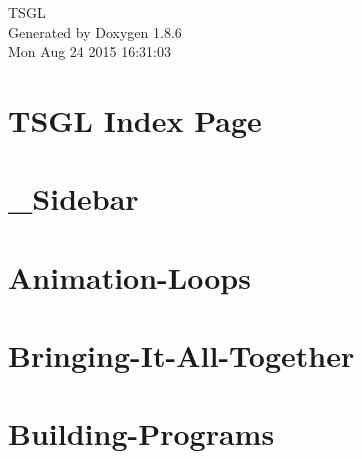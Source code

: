 \documentclass[twoside]{book}
\newcommand{\clearemptydoublepage}{%
  \newpage{\pagestyle{empty}\cleardoublepage}%
}
\begin{document}
\hypersetup{pageanchor=false}
\begin{titlepage}
\vspace*{7cm}
\begin{center}%
{\Large T\-S\-G\-L }\\
\vspace*{1cm}
{\large Generated by Doxygen 1.8.6}\\
\vspace*{0.5cm}
{\small Mon Aug 24 2015 16:31:03}\\
\end{center}
\end{titlepage}
\clearemptydoublepage
\tableofcontents
\clearemptydoublepage
{}
\hypersetup{pageanchor=true}

\chapter{T\-S\-G\-L Index Page}
\label{index}\hypertarget{index}{}
\chapter{\-\_\-\-Sidebar}
\label{md__home_kodemonkey__desktop__t_s_g_l_docs-wiki___sidebar}
\hypertarget{md__home_kodemonkey__desktop__t_s_g_l_docs-wiki___sidebar}{}

\chapter{Animation-\/\-Loops}
\label{md__home_kodemonkey__desktop__t_s_g_l_docs-wiki__animation-_loops}
\hypertarget{md__home_kodemonkey__desktop__t_s_g_l_docs-wiki__animation-_loops}{}

\chapter{Bringing-\/\-It-\/\-All-\/\-Together}
\label{md__home_kodemonkey__desktop__t_s_g_l_docs-wiki__bringing-_it-_all-_together}
\hypertarget{md__home_kodemonkey__desktop__t_s_g_l_docs-wiki__bringing-_it-_all-_together}{}

\chapter{Building-\/\-Programs}
\label{md__home_kodemonkey__desktop__t_s_g_l_docs-wiki__building-_programs}
\hypertarget{md__home_kodemonkey__desktop__t_s_g_l_docs-wiki__building-_programs}{}

\end{document}
